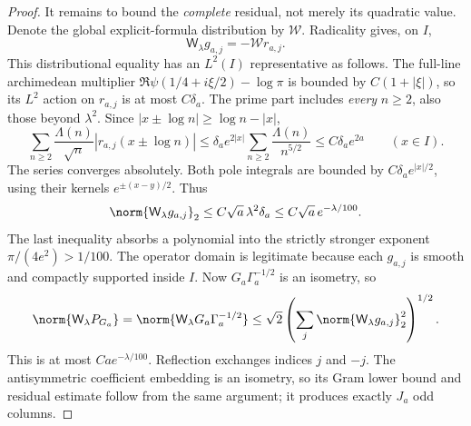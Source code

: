 \begin{proof}
It remains to bound the \emph{complete} residual, not merely its
quadratic value.  Denote the global explicit-formula distribution by
$\mathcal W$.  Radicality gives, on $I$,
\[
 \mathsf W_\lambda g_{a,j}=-\mathcal W r_{a,j}.
\]
This distributional equality has an $L^2(I)$ representative as follows.
The full-line archimedean multiplier
$\Re\psi(1/4+i\xi/2)-\log\pi$ is bounded by $C(1+|\xi|)$,
so its $L^2$ action on $r_{a,j}$ is at most $C\delta_a$.
The prime part includes \emph{every} $n\ge2$, also those beyond
$\lambda^2$.  Since $|x\pm\log n|\ge\log n-|x|$,
\[
 \sum_{n\ge2}\frac{\Lambda(n)}{\sqrt n}
   |r_{a,j}(x\pm\log n)|
 \le\delta_a e^{2|x|}
             \sum_{n\ge2}\frac{\Lambda(n)}{n^{5/2}}
 \le C\delta_a e^{2a}\qquad(x\in I).
\]
The series converges absolutely.  Both pole integrals are bounded
by $C\delta_a e^{|x|/2}$, using their kernels $e^{\pm(x-y)/2}$.
Thus
\[
 \norm{\mathsf W_\lambda g_{a,j}}_2
 \le C\sqrt a\,\lambda^2\delta_a
 \le C\sqrt a\,e^{-\lambda/100}.
\]
The last inequality absorbs a polynomial into the strictly stronger
exponent $\pi/(4e^2)>1/100$.  The operator domain is legitimate
because each $g_{a,j}$ is smooth and compactly supported inside $I$.
Now $G_a\Gamma_a^{-1/2}$ is an isometry, so
\[
 \norm{\mathsf W_\lambda P_{G_a}}
 =\norm{\mathsf W_\lambda G_a\Gamma_a^{-1/2}}
 \le\sqrt2\left(\sum_j
             \norm{\mathsf W_\lambda g_{a,j}}_2^2\right)^{1/2}.
\]
This is at most $Ca e^{-\lambda/100}$.  Reflection exchanges
indices $j$ and $-j$.  The antisymmetric coefficient embedding is
an isometry, so its Gram lower bound and residual estimate follow
from the same argument; it produces exactly $J_a$ odd columns.
\end{proof}

